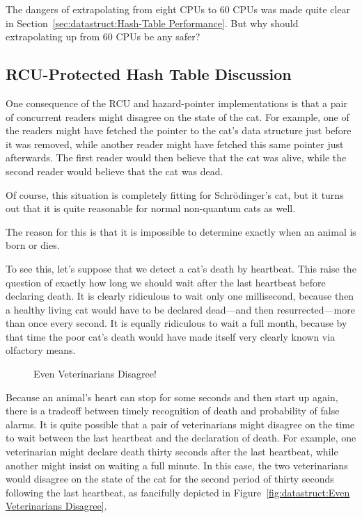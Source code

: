 \QuickQuiz{}
	The dangers of extrapolating from eight CPUs to 60 CPUs was
	made quite clear in
	Section~\ref{sec:datastruct:Hash-Table Performance}.
	But why should extrapolating up from 60 CPUs be any safer?
 \QuickQuizEnd

\subsection{RCU-Protected Hash Table Discussion}
\label{sec:datastruct:RCU-Protected Hash Table Discussion}

One consequence of the RCU and hazard-pointer implementations is
that a pair of concurrent readers might disagree on the state of
the cat.
For example, one of the readers might have fetched the pointer to
the cat's data structure just before it was removed, while another
reader might have fetched this same pointer just afterwards.
The first reader would then believe that the cat was alive, while
the second reader would believe that the cat was dead.

Of course, this situation is completely fitting for Schr\"odinger's
cat, but it turns out that it is quite reasonable for normal
non-quantum cats as well.

The reason for this is that it is impossible to determine exactly
when an animal is born or dies.

To see this, let's suppose that we detect a cat's death by heartbeat.
This raise the question of exactly how long we should wait after the
last heartbeat before declaring death.
It is clearly ridiculous to wait only one millisecond, because then
a healthy living cat would have to be declared dead---and then
resurrected---more than once every second.
It is equally ridiculous to wait a full month, because by that time
the poor cat's death would have made itself very clearly known
via olfactory means.

\begin{figure}[tb]
\centering
{}
\caption{Even Veterinarians Disagree!}
\end{figure}

Because an animal's heart can stop for some seconds and then start up
again, there is a tradeoff between timely recognition of death and
probability of false alarms.
It is quite possible that a pair of veterinarians might disagree on
the time to wait between the last heartbeat and the declaration of
death.
For example, one veterinarian might declare death thirty seconds after
the last heartbeat, while another might insist on waiting a full
minute.
In this case, the two veterinarians would disagree on the state of the
cat for the second period of thirty seconds following the last heartbeat,
as fancifully depicted in
Figure~\ref{fig:datastruct:Even Veterinarians Disagree}.

